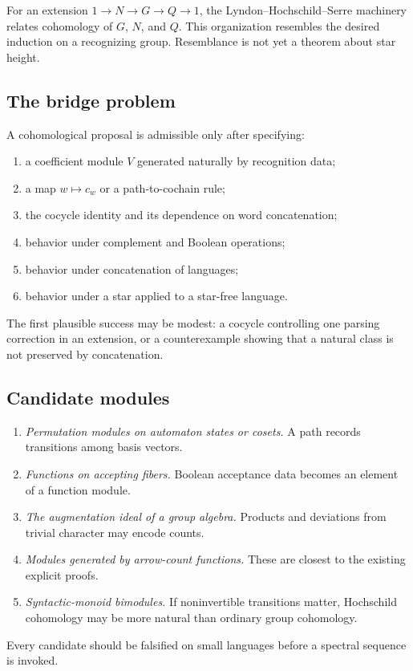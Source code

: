 \documentclass{amsart}
\begin{document}
For an extension $1\to N\to G\to Q\to1$, the Lyndon--Hochschild--Serre machinery relates cohomology of $G$, $N$, and $Q$.  This organization resembles the desired induction on a recognizing group.  Resemblance is not yet a theorem about star height.

\subsection{The bridge problem}

A cohomological proposal is admissible only after specifying:
\begin{enumerate}
  \item a coefficient module $V$ generated naturally by recognition data;
  \item a map $w\mapsto c_w$ or a path-to-cochain rule;
  \item the cocycle identity and its dependence on word concatenation;
  \item behavior under complement and Boolean operations;
  \item behavior under concatenation of languages;
  \item behavior under a star applied to a star-free language.
\end{enumerate}
The first plausible success may be modest: a cocycle controlling one parsing correction in an extension, or a counterexample showing that a natural class is not preserved by concatenation.

\subsection{Candidate modules}

\begin{enumerate}
  \item \emph{Permutation modules on automaton states or cosets.}  A path records transitions among basis vectors.
  \item \emph{Functions on accepting fibers.}  Boolean acceptance data becomes an element of a function module.
  \item \emph{The augmentation ideal of a group algebra.}  Products and deviations from trivial character may encode counts.
  \item \emph{Modules generated by arrow-count functions.}  These are closest to the existing explicit proofs.
  \item \emph{Syntactic-monoid bimodules.}  If noninvertible transitions matter, Hochschild cohomology may be more natural than ordinary group cohomology.
\end{enumerate}
Every candidate should be falsified on small languages before a spectral sequence is invoked.
\end{document}

